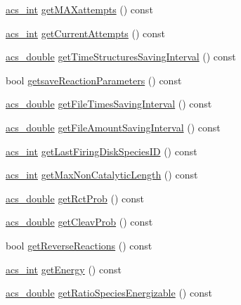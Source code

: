 \begin{DoxyCompactItemize}
\item 
\hyperlink{a00016_a8d277355641a098190360234e2ebde35}{acs\-\_\-int} \hyperlink{a00003_ae626b961a53eeb5e08b4190da235e8dd}{get\-M\-A\-Xattempts} () const 
\item 
\hyperlink{a00016_a8d277355641a098190360234e2ebde35}{acs\-\_\-int} \hyperlink{a00003_a0851e3481e6fec7f4feef126d5a6704c}{get\-Current\-Attempts} () const 
\item 
\hyperlink{a00016_ab776853a005fcbf56af0424a2a4dd607}{acs\-\_\-double} \hyperlink{a00003_a892dd7bd29342c4206c39556d91a83da}{get\-Time\-Structures\-Saving\-Interval} () const 
\item 
bool \hyperlink{a00003_a19f10c43e263fbc167bbd4cc760c92ff}{getsave\-Reaction\-Parameters} () const 
\item 
\hyperlink{a00016_ab776853a005fcbf56af0424a2a4dd607}{acs\-\_\-double} \hyperlink{a00003_a77e995bee54ab4e09f165a857a7b0272}{get\-File\-Times\-Saving\-Interval} () const 
\item 
\hyperlink{a00016_ab776853a005fcbf56af0424a2a4dd607}{acs\-\_\-double} \hyperlink{a00003_adf74cb3545d95a7965e3a18cfc98cebe}{get\-File\-Amount\-Saving\-Interval} () const 
\item 
\hyperlink{a00016_a8d277355641a098190360234e2ebde35}{acs\-\_\-int} \hyperlink{a00003_a984f79e5f89b774b65db901899687ac0}{get\-Last\-Firing\-Disk\-Species\-I\-D} () const 
\item 
\hyperlink{a00016_a8d277355641a098190360234e2ebde35}{acs\-\_\-int} \hyperlink{a00003_aca760caf9354f541020c1db58490b18f}{get\-Max\-Non\-Catalytic\-Length} () const 
\item 
\hyperlink{a00016_ab776853a005fcbf56af0424a2a4dd607}{acs\-\_\-double} \hyperlink{a00003_ae244aa972cf10c103b8b20d95703831f}{get\-Rct\-Prob} () const 
\item 
\hyperlink{a00016_ab776853a005fcbf56af0424a2a4dd607}{acs\-\_\-double} \hyperlink{a00003_ac728f6ab012c42fa85a2e2f70df7dc58}{get\-Cleav\-Prob} () const 
\item 
bool \hyperlink{a00003_a2a2ac2a8140df67688a71d3349adf04a}{get\-Reverse\-Reactions} () const 
\item 
\hyperlink{a00016_a8d277355641a098190360234e2ebde35}{acs\-\_\-int} \hyperlink{a00003_ab463a460de102c79c1044ab8a2c176ae}{get\-Energy} () const 
\item 
\hyperlink{a00016_ab776853a005fcbf56af0424a2a4dd607}{acs\-\_\-double} \hyperlink{a00003_a4fcc6030b68a37bedff870b9c48c188d}{get\-Ratio\-Species\-Energizable} () const 
\item 

\end{DoxyCompactItemize}
